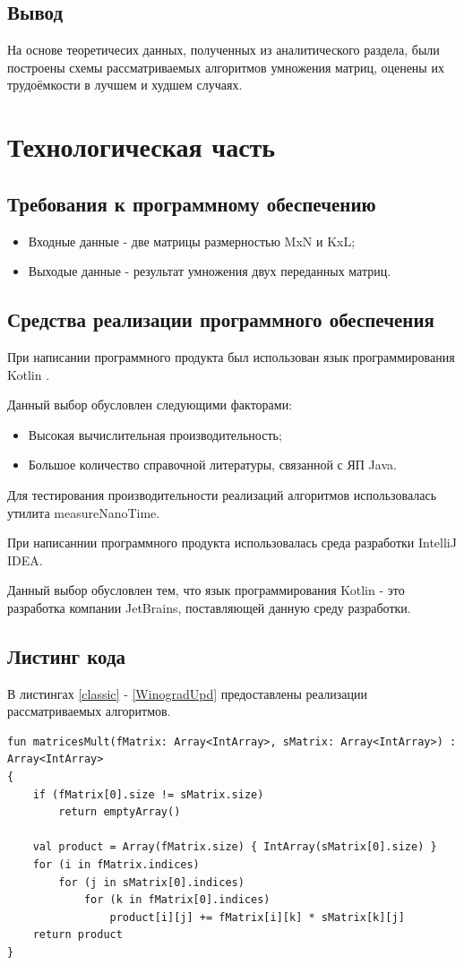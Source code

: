 \documentclass[12pt]{report}
\begin{document}
\section*{Вывод}
На основе теоретичесих данных, полученных из аналитического раздела, были построены схемы рассматриваемых алгоритмов умножения матриц, оценены их трудоёмкости в лучшем и худшем случаях.

\chapter{Технологическая часть}
\section{Требования к программному обеспечению}
\begin{itemize}
\item Входные данные - две матрицы размерностью MxN и KxL;
\item Выходые данные - результат умножения двух переданных матриц.
\end{itemize}
\section{Средства реализации программного обеспечения}
При написании программного продукта был использован язык программирования Kotlin \cite{Kotlin}.

Данный выбор обусловлен следующими факторами:
\begin{itemize}
\item Высокая вычислительная производительность;
\item Большое количество справочной литературы, связанной с ЯП Java.
\end{itemize}

Для тестирования производительности реализаций алгоритмов использовалась утилита measureNanoTime.

При написаннии программного продукта использовалась среда разработки IntelliJ IDEA.

Данный выбор обусловлен тем, что язык программирования Kotlin - это разработка компании JetBrains, поставляющей данную среду разработки.

\section{Листинг кода}
В листингах \ref{classic} - \ref{WinogradUpd} предоставлены реализации рассматриваемых алгоритмов.
\begin{lstlisting}[caption=Функция реализации алгоритма классического умножения матриц,
label={classic}]
fun matricesMult(fMatrix: Array<IntArray>, sMatrix: Array<IntArray>) : Array<IntArray>
{
    if (fMatrix[0].size != sMatrix.size)
        return emptyArray()

    val product = Array(fMatrix.size) { IntArray(sMatrix[0].size) }
    for (i in fMatrix.indices)
        for (j in sMatrix[0].indices)
            for (k in fMatrix[0].indices)
                product[i][j] += fMatrix[i][k] * sMatrix[k][j]
    return product
}
\end{lstlisting}
\end{document}
